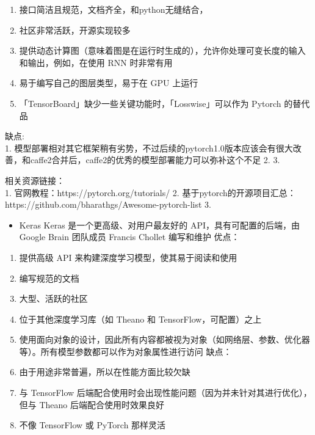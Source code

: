 \begin{enumerate}
\def\labelenumi{\arabic{enumi}.}
\item
  接口简洁且规范，文档齐全，和python无缝结合，
\item
  社区非常活跃，开源实现较多
\item
  提供动态计算图（意味着图是在运行时生成的），允许你处理可变长度的输入和输出，例如，在使用
  RNN 时非常有用
\item
  易于编写自己的图层类型，易于在 GPU 上运行
\item
  「TensorBoard」缺少一些关键功能时，「Losswise」可以作为 Pytorch
  的替代品
\end{enumerate}

缺点:\\
1.
模型部署相对其它框架稍有劣势，不过后续的pytorch1.0版本应该会有很大改善，和caffe2合并后，caffe2的优秀的模型部署能力可以弥补这个不足
2. 3.

相关资源链接：\\
1. 官网教程：https://pytorch.org/tutorials/ 2.
基于pytorch的开源项目汇总：https://github.com/bharathgs/Awesome-pytorch-list
3.

\begin{itemize}
\item
  Keras Keras 是一个更高级、对用户最友好的 API，具有可配置的后端，由
  Google Brain 团队成员 Francis Chollet 编写和维护 优点：\\
\end{itemize}

\begin{enumerate}
\def\labelenumi{\arabic{enumi}.}
\item
  提供高级 API 来构建深度学习模型，使其易于阅读和使用
\item
  编写规范的文档
\item
  大型、活跃的社区
\item
  位于其他深度学习库（如 Theano 和 TensorFlow，可配置）之上
\item
  使用面向对象的设计，因此所有内容都被视为对象（如网络层、参数、优化器等）。所有模型参数都可以作为对象属性进行访问
  缺点：\\
\item
  由于用途非常普遍，所以在性能方面比较欠缺
\item
  与 TensorFlow
  后端配合使用时会出现性能问题（因为并未针对其进行优化），但与 Theano
  后端配合使用时效果良好
\item
  不像 TensorFlow 或 PyTorch 那样灵活
\end{enumerate}

